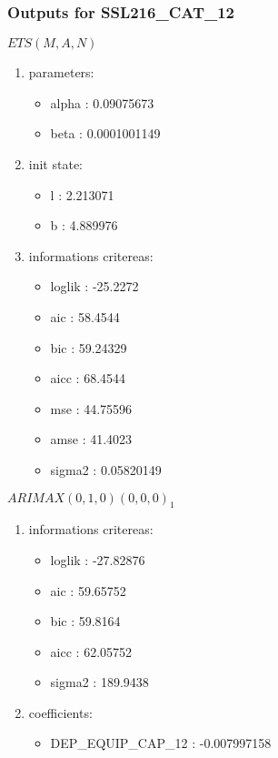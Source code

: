 \documentclass[10pt,a4paper]{article}\usepackage[]{graphicx}\usepackage[]{color}
\newcommand{\AaA}{\_}
\begin{document}
\subsubsection{Outputs for SSL216\AaA CAT\AaA 12}
\begin{multicols}{2}


$ ETS(M,A,N) $
\begin{enumerate}
\item parameters:
\begin{itemize}
\item  alpha :  0.09075673 
\item  beta :  0.0001001149 
\end{itemize}
\item init state:
\begin{itemize}
\item  l :  2.213071 
\item  b :  4.889976 
\end{itemize}
\item informations critereas:
\begin{itemize}
\item  loglik :  -25.2272 
\item  aic :  58.4544 
\item  bic :  59.24329 
\item  aicc :  68.4544 
\item  mse :  44.75596 
\item  amse :  41.4023 
\item  sigma2 :  0.05820149 
\end{itemize}
\end{enumerate}

\columnbreak


 $ARIMAX(0,1,0)(0,0,0)_{1}$ 
\begin{enumerate}
\item informations critereas:
\begin{itemize}
\item  loglik :  -27.82876 
\item  aic :  59.65752 
\item  bic :  59.8164 
\item  aicc :  62.05752 
\item  sigma2 :  189.9438 
\end{itemize}

\item coefficients:
\begin{itemize}
\item  DEP\AaA EQUIP\AaA CAP\AaA 12 :  -0.007997158 
\end{itemize}
\end{enumerate}
\end{multicols}
\end{document}
